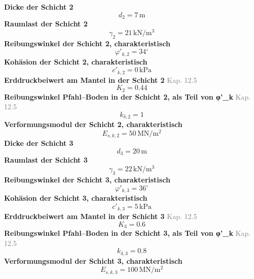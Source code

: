 \documentclass[11pt,a4paper]{article}
\newcommand{\normref}[1]{{\small\textcolor{gray}{#1}}}
\begin{document}
\noindent\textbf{Dicke der Schicht 2}
\begin{equation*}
d_{2} = 7\,\mathrm{m}
\end{equation*}
\noindent\textbf{Raumlast der Schicht 2}
\begin{equation*}
\gamma_{2} = 21\,\mathrm{kN}/\mathrm{m}^{3}
\end{equation*}
\noindent\textbf{Reibungswinkel der Schicht 2, charakteristisch}
\begin{equation*}
\varphi'_{k,2} = 34{}^{\circ}
\end{equation*}
\noindent\textbf{Kohäsion der Schicht 2, charakteristisch}
\begin{equation*}
c'_{k,2} = 0\,\mathrm{kPa}
\end{equation*}
\noindent\textbf{Erddruckbeiwert am Mantel in der Schicht 2} \hfill \normref{Kap. 12.5}
\begin{equation*}
K_{2} = 0.44
\end{equation*}
\noindent\textbf{Reibungswinkel Pfahl–Boden in der Schicht 2, als Teil von φ'\_k} \hfill \normref{Kap. 12.5}
\begin{equation*}
k_{\delta,2} = 1
\end{equation*}
\noindent\textbf{Verformungsmodul der Schicht 2, charakteristisch}
\begin{equation*}
E_{s,k,2} = 50\,\mathrm{MN}/\mathrm{m}^{2}
\end{equation*}
\noindent\textbf{Dicke der Schicht 3}
\begin{equation*}
d_{3} = 20\,\mathrm{m}
\end{equation*}
\noindent\textbf{Raumlast der Schicht 3}
\begin{equation*}
\gamma_{3} = 22\,\mathrm{kN}/\mathrm{m}^{3}
\end{equation*}
\noindent\textbf{Reibungswinkel der Schicht 3, charakteristisch}
\begin{equation*}
\varphi'_{k,3} = 36{}^{\circ}
\end{equation*}
\noindent\textbf{Kohäsion der Schicht 3, charakteristisch}
\begin{equation*}
c'_{k,3} = 5\,\mathrm{kPa}
\end{equation*}
\noindent\textbf{Erddruckbeiwert am Mantel in der Schicht 3} \hfill \normref{Kap. 12.5}
\begin{equation*}
K_{3} = 0.6
\end{equation*}
\noindent\textbf{Reibungswinkel Pfahl–Boden in der Schicht 3, als Teil von φ'\_k} \hfill \normref{Kap. 12.5}
\begin{equation*}
k_{\delta,3} = 0.8
\end{equation*}
\noindent\textbf{Verformungsmodul der Schicht 3, charakteristisch}
\begin{equation*}
E_{s,k,3} = 100\,\mathrm{MN}/\mathrm{m}^{2}
\end{equation*}
\end{document}
